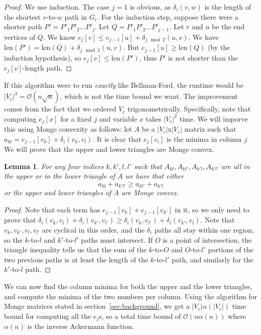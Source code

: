 \documentclass[11pt]{article}
\newtheorem{lemma}[theorem]{Lemma}
\begin{document}
\begin{proof}
We use induction. The case $j=1$ is obvious, as $\delta_i(v,w)$ is the length of the shortest $v$-to-$w$ path in $G_i$. For the induction step, suppose there were a shorter path $P' = P'_1P'_2\ldots P'_j$. Let $Q = P'_1P'_2\ldots P'_{j-1}$. Let $r$ and $u$ be the end vertices of $Q$. We know $e_j[v] \leq e_{j-1}[u] + \delta_{j\mod 2}(u,v)$. We have $\text{len}(P') = \text{len}(Q) + \delta_{j\mod 2}(u,v)$. But $e_{j-1}[u]\geq \text{len}(Q)$ (by the induction hypothesis), so $e_j[v]\leq \text{len}(P')$, thus $P'$ is not shorter than the $e_j[v]$-length path.
\end{proof}

If this algorithm were to run \textit{exactly} like Bellman-Ford, the runtime would be $|V_c|^3 = \mathcal{O}(n\sqrt{n})$, which is not the time bound we want. The improvement comes from the fact that we ordered $V_c$ trigonometrically. Specifically, note that computing $e_j[x]$ for a fixed $j$ and variable $x$ takes $|V_c|^2$ time. We will imporve this using Monge convexity as follows: let $A$ be a $|V_c|$x$|V_c|$ matrix such that $a_{kl} = e_{j-1}[v_k]+\delta_i(v_k,v_l)$. It is clear that $e_j[v_i]$ is the minima in column $j$. We will prove that the upper and lower triangles are Monge convex.\\

\begin{lemma}
For any four indices $k,k',l,l'$ such that $A_{kl}, A_{kl'}, A_{k'l}, A_{k'l'}$ are all in the upper or in the lower triangle of $A$ we have that either $$a_{kl}+a_{k'l'} \geq a_{kl'}+a_{k'l}$$ or the upper and lower triangles of $A$ are Monge convex.
\end{lemma}

\begin{proof}
Note that each term has $e_{j-1}[v_k] + e_{j-1}[v_{k'}]$ in it, so we only need to prove that $\delta_i(v_k,v_l) + \delta_i(v_{k'},v_{l'}) \geq \delta_i(v_k,v_{l'})+\delta_i(v_{k'},v_l)$. Note that $v_k,v_{k'},v_l,v_{l'}$ are cyclical in this order, and the $\delta_i$ paths all stay within one region, so the $k$-to-$l$ and $k'$-to-$l'$ paths must intersect. If $O$ is a point of intersection, the triangle inequality tells us that the sum of the $k$-to-$O$ and $O$-to-$l'$ portions of the two previous paths is at least the length of the $k$-to-$l'$ path, and similarly for the $k'$-to-$l$ path. 
\end{proof}

We can now find the column minima for both the upper and the lower triangles, and compute the minima of the two numbers per column. Using the algorithm for Monge matrices stated in section~\ref{sec:background}, we get a $|V_c|\alpha(|V_c|)$ time bound for computing all the $e_j$s, so a total time bound of $\mathcal{O}(n\alpha(n))$ where $\alpha(n)$ is the inverse Ackermann function.
\end{document}
